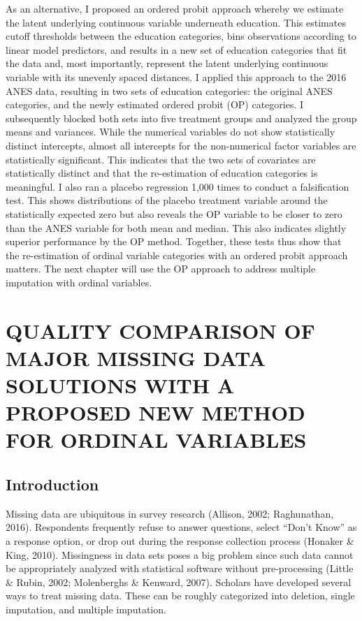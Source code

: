\documentclass[12pt,econ]{sources/authesis}
\begin{document}
As an alternative, I proposed an ordered probit approach whereby we estimate the latent underlying continuous variable underneath education. This estimates cutoff thresholds between the education categories, bins observations according to linear model predictors, and results in a new set of education categories that fit the data and, most importantly, represent the latent underlying continuous variable with its unevenly spaced distances. I applied this approach to the 2016 ANES data, resulting in two sets of education categories: the original ANES categories, and the newly estimated ordered probit (OP) categories. I subsequently blocked both sets into five treatment groups and analyzed the group means and variances. While the numerical variables do not show statistically distinct intercepts, almost all intercepts for the non-numerical factor variables are statistically significant. This indicates that the two sets of covariates are statistically distinct and that the re-estimation of education categories is meaningful. I also ran a placebo regression 1,000 times to conduct a falsification test. This shows distributions of the placebo treatment variable around the statistically expected zero but also reveals the OP variable to be closer to zero than the ANES variable for both mean and median. This also indicates slightly superior performance by the OP method. Together, these tests thus show that the re-estimation of ordinal variable categories with an ordered probit approach matters. The next chapter will use the OP approach to address multiple imputation with ordinal variables.

\hypertarget{ordmiss}{%
\chapter{QUALITY COMPARISON OF MAJOR MISSING DATA SOLUTIONS WITH A PROPOSED NEW METHOD FOR ORDINAL VARIABLES}\label{ordmiss}}

\hypertarget{ordmiss-intro}{%
\section{Introduction}\label{ordmiss-intro}}

Missing data are ubiquitous in survey research (Allison, 2002; Raghunathan, 2016). Respondents frequently refuse to answer questions, select ``Don't Know'' as a response option, or drop out during the response collection process (Honaker \& King, 2010). Missingness in data sets poses a big problem since such data cannot be appropriately analyzed with statistical software without pre-processing (Little \& Rubin, 2002; Molenberghs \& Kenward, 2007). Scholars have developed several ways to treat missing data. These can be roughly categorized into deletion, single imputation, and multiple imputation.
\end{document}
